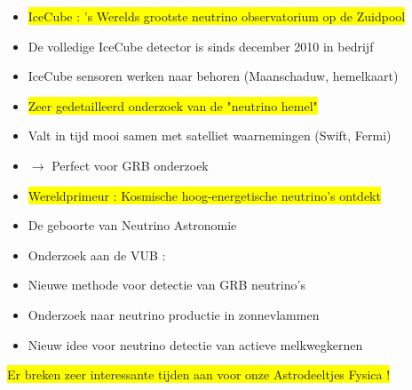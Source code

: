 \onecolumn
\begin{itemize}
\item \colorbox{yellow}{IceCube : 's Werelds grootste neutrino observatorium op de Zuidpool}
\item[] De volledige IceCube detector is sinds december 2010 in bedrijf
\item[] IceCube sensoren werken naar behoren (Maanschaduw, hemelkaart)
\item \colorbox{yellow}{Zeer gedetailleerd onderzoek van de "neutrino hemel"}
\item[] Valt in tijd mooi samen met satelliet waarnemingen (Swift, Fermi)
\item[] $\rightarrow$ Perfect voor GRB onderzoek
\item \colorbox{yellow}{Wereldprimeur : Kosmische hoog-energetische neutrino's ontdekt}
\item[] \begin{center}{\blue De geboorte van Neutrino Astronomie}\end{center}
\item {\red Onderzoek aan de VUB :}
\item[] Nieuwe methode voor detectie van GRB neutrino's
\item[] Onderzoek naar neutrino productie in zonnevlammen
\item[] Nieuw idee voor neutrino detectie van actieve melkwegkernen 
\end{itemize}
%
\begin{center}
\colorbox{yellow}{Er breken zeer interessante tijden aan voor onze Astrodeeltjes Fysica !}
\end{center}

